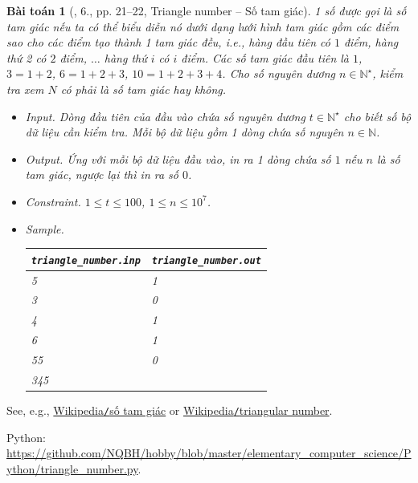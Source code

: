 \documentclass{article}
\newtheorem{baitoan}{Bài toán}
\begin{document}
\begin{baitoan}[\cite{Duc_200_BT_Python}, 6., pp. 21--22, Triangle number -- Số tam giác]
	1 số được gọi là \emph{số tam giác} nếu ta có thể biểu diễn nó dưới dạng lưới hình tam giác gồm các điểm sao cho các điểm tạo thành 1 tam giác đều, i.e., hàng đầu tiên có $1$ điểm, hàng thứ 2 có $2$ điểm, $\ldots$ hàng thứ $i$ có $i$ điểm. Các số tam giác đầu tiên là $1$, $3 = 1 + 2$, $6 = 1 + 2 + 3$, $10 = 1 + 2 + 3 + 4$. Cho số nguyên dương $n\in\mathbb{N}^\star$, kiểm tra xem $N$ có phải là số tam giác hay không. 
	\begin{itemize}
		\item {\sf Input.} Dòng đầu tiên của đầu vào chứa số nguyên dương $t\in\mathbb{N}^\star$ cho biết số bộ dữ liệu cần kiểm tra. Mỗi bộ dữ liệu gồm 1 dòng chứa số nguyên $n\in\mathbb{N}$.
		\item {\sf Output.} Ứng với mỗi bộ dữ liệu đầu vào, in ra 1 dòng chứa số $1$ nếu $n$ là số tam giác, ngược lại thì in ra số $0$.
		\item {\sf Constraint.} $1\le t\le100$, $1\le n\le10^7$.
		\item {\sf Sample.}
		\begin{table}[H]
			\centering
			\begin{tabular}{|l|l|}
				\hline
				\verb|triangle_number.inp| & \verb|triangle_number.out| \\
				\hline
				5 & 1 \\
				3 & 0 \\
				4 & 1 \\
				6 & 1 \\
				55 & 0 \\
				345 & \\
				\hline
			\end{tabular}
		\end{table}
	\end{itemize}
\end{baitoan}
See, e.g., \href{https://vi.wikipedia.org/wiki/S%E1%BB%91_tam_gi%C3%A1c}{Wikipedia{\tt /}số tam giác} or \href{https://en.wikipedia.org/wiki/Triangular_number}{Wikipedia{\tt /}triangular number}.

Python: \url{https://github.com/NQBH/hobby/blob/master/elementary_computer_science/Python/triangle_number.py}.
\end{document}

